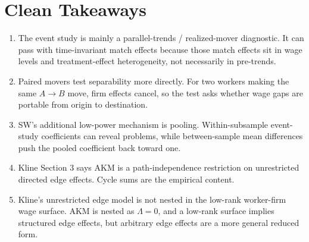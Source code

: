 \documentclass[11pt]{article}
\begin{document}
\section{Clean Takeaways}

\begin{enumerate}
\item The event study is mainly a parallel-trends / realized-mover diagnostic. It can
pass with time-invariant match effects because those match effects sit in wage levels
and treatment-effect heterogeneity, not necessarily in pre-trends.

\item Paired movers test separability more directly. For two workers making the same
$A\to B$ move, firm effects cancel, so the test asks whether wage gaps are portable
from origin to destination.

\item SW's additional low-power mechanism is pooling. Within-subsample event-study
coefficients can reveal problems, while between-sample mean differences push the
pooled coefficient back toward one.

\item Kline Section 3 says AKM is a path-independence restriction on unrestricted
directed edge effects. Cycle sums are the empirical content.

\item Kline's unrestricted edge model is not nested in the low-rank worker-firm wage
surface. AKM is nested as $\Lambda=0$, and a low-rank surface implies structured
edge effects, but arbitrary edge effects are a more general reduced form.
\end{enumerate}
\end{document}
